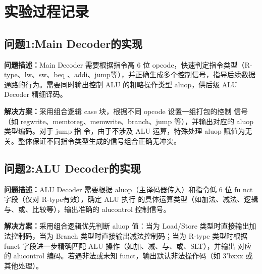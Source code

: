 \section{实验过程记录}
\subsection{问题1:Main Decoder的实现}
\textbf{问题描述：}Main Decoder 需要根据指令高 6 位 opcode，快速判定指令类型（R-type、lw、sw、beq
、addi、jump等），并正确生成多个控制信号，指导后续数据通路的行为。需要同时输出控制 ALU 的粗略操作类型 aluop，供后级 ALU Decoder 精细译码。

\textbf{解决方案：}采用组合逻辑 case 块，根据不同 opcode 设置一组打包的控制
信号（如 regwrite、memtoreg、memwrite、branch、jump 等），并输出对应的 aluop 类型编码。对于 jump 指
令，由于不涉及 ALU 运算，特殊处理 aluop 赋值为无关。整体保证不同指令类型生成的信号组合正确无冲突。
 \subsection{问题2:ALU Decoder的实现}
\textbf{问题描述：}ALU Decoder 需要根据 aluop（主译码器传入）和指令低 6 位 fu
nct 字段（仅对 R-type有效），确定 ALU 执行
的具体运算类型（如加法、减法、逻辑与、或、比较等），输出准确的 alucontrol 控制信号。

\textbf{解决方案：}采用组合逻辑优先判断 aluop 值：当为 Load/Store 
类型时直接输出加法控制码，当为 Branch 类型时直接输出减法控制码；当为 
R-type 类型时根据 funct 字段进一步精确匹配 ALU 操作（如加、减、与、或、SLT），并输出
对应的 alucontrol 编码。若遇非法或未知 funct，输出默认非法操作码（如 3'bxxx 或其他处理）。
